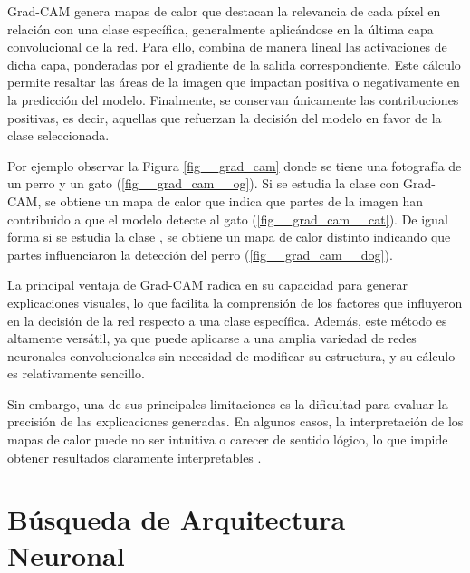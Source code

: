 Grad-CAM genera mapas de calor que destacan la relevancia de cada píxel en relación con una clase específica, generalmente aplicándose en la última capa convolucional de la red. Para ello, combina de manera lineal las activaciones de dicha capa, ponderadas por el gradiente de la salida correspondiente. Este cálculo permite resaltar las áreas de la imagen que impactan positiva o negativamente en la predicción del modelo. Finalmente, se conservan únicamente las contribuciones positivas, es decir, aquellas que refuerzan la decisión del modelo en favor de la clase seleccionada.

Por ejemplo observar la Figura \ref{fig__grad_cam} donde se tiene una fotografía de un perro y un gato (\ref{fig__grad_cam__og}). Si se estudia la clase  con Grad-CAM, se obtiene un mapa de calor que indica que partes de la imagen han contribuido a que el modelo detecte al gato (\ref{fig__grad_cam__cat}). De igual forma si se estudia la clase , se obtiene un mapa de calor distinto indicando que partes influenciaron la detección del perro (\ref{fig__grad_cam__dog}).

La principal ventaja de Grad-CAM radica en su capacidad para generar explicaciones visuales, lo que facilita la comprensión de los factores que influyeron en la decisión de la red respecto a una clase específica. Además, este método es altamente versátil, ya que puede aplicarse a una amplia variedad de redes neuronales convolucionales sin necesidad de modificar su estructura, y su cálculo es relativamente sencillo.

Sin embargo, una de sus principales limitaciones es la dificultad para evaluar la precisión de las explicaciones generadas. En algunos casos, la interpretación de los mapas de calor puede no ser intuitiva o carecer de sentido lógico, lo que impide obtener resultados claramente interpretables \cite{molnar2025}.

\FloatBarrier

\section{Búsqueda de Arquitectura Neuronal}
\label{section2:nas}

